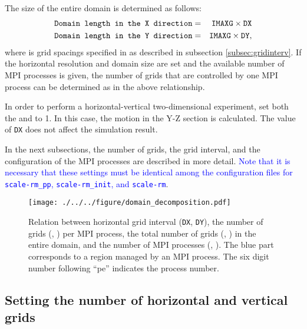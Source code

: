 The size of the entire domain is determined as follows:
\begin{eqnarray}
 \verb|Domain length in the X direction| &=& \nmitemeq{IMAXG} \times \nmitemeq{DX}\\
 \verb|Domain length in the Y direction| &=& \nmitemeq{IMAXG} \times \nmitemeq{DY},
\end{eqnarray}
where  is grid spacings specified in  as described in subsection \ref{subsec:gridinterv}.
If the horizontal resolution and domain size are set and the available number of MPI processes is given, the number of grids that are controlled by one MPI process can be determined as in the above relationship.

In order to perform a horizontal-vertical two-dimensional experiment, set both the  and  to 1.
In this case, the motion in the Y-Z section is calculated.
The value of \texttt{DX} does not affect the simulation result.

In the next subsections, the number of grids, the grid interval, and the configuration of the MPI processes are described in more detail.
\textcolor{blue}{Note that it is necessary that these settings must be identical among the configuration files for \texttt{scale-rm\_pp},  \texttt{scale-rm\_init}, and \texttt{scale-rm}}.

\begin{figure}[h]
\begin{center}
  \texttt{[image: ./../../figure/domain\_decomposition.pdf]}\\
  \caption{Relation between horizontal grid interval (\texttt{DX}, \texttt{DY}),
   the number of grids (, ) per MPI process,
   the total number of grids (, ) in the entire domain,
   and the number of MPI processes (, ).
   The blue part corresponds to a region managed by an MPI process.
   The six digit number following ``pe'' indicates the process number.}
  \label{fig:domain}
\end{center}
\end{figure}

\subsection{Setting the number of horizontal and vertical grids} \label{subsec:relation_dom_reso3}

